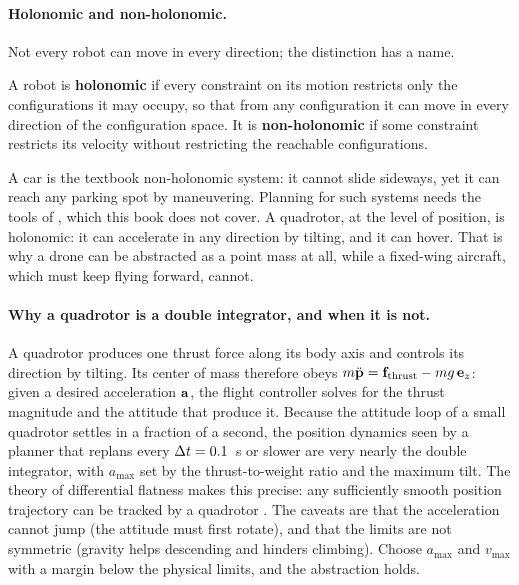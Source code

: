 \paragraph{Holonomic and non-holonomic.}
Not every robot can move in every direction; the distinction has a name.
\begin{definition}
\label{def:ch02-holonomic}
A robot is \textbf{holonomic} if every constraint on its motion restricts only the configurations it may occupy, so that from any configuration it can move in every direction of the configuration space. It is \textbf{non-holonomic} if some constraint restricts its velocity without restricting the reachable configurations.
\end{definition}
A car is the textbook non-holonomic system: it cannot slide sideways, yet it can reach any parking spot by maneuvering. Planning for such systems needs the tools of \textcite{lavalle2006planning}, which this book does not cover. A quadrotor, at the level of position, is holonomic: it can accelerate in any direction by tilting, and it can hover. That is why a drone can be abstracted as a point mass at all, while a fixed-wing aircraft, which must keep flying forward, cannot.

\paragraph{Why a quadrotor is a double integrator, and when it is not.}
A quadrotor produces one thrust force along its body axis and controls its direction by tilting. Its center of mass therefore obeys $m\ddot{\mathbf{p}}=\mathbf{f}_{\text{thrust}}-m g\,\mathbf{e}_z$: given a desired acceleration $\mathbf{a}$, the flight controller solves for the thrust magnitude and the attitude that produce it. Because the attitude loop of a small quadrotor settles in a fraction of a second, the position dynamics seen by a planner that replans every $\Delta t=0.1$~s or slower are very nearly the double integrator, with $a_{\max}$ set by the thrust-to-weight ratio and the maximum tilt. The theory of differential flatness makes this precise: any sufficiently smooth position trajectory can be tracked by a quadrotor \cite{mellinger2011minimum}. The caveats are that the acceleration cannot jump (the attitude must first rotate), and that the limits are not symmetric (gravity helps descending and hinders climbing). Choose $a_{\max}$ and $v_{\max}$ with a margin below the physical limits, and the abstraction holds.

